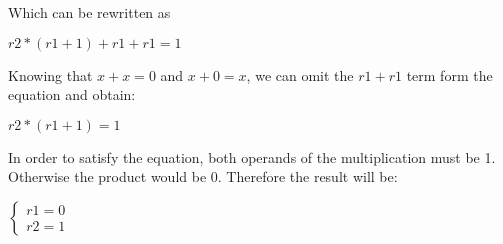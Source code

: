 Which can be rewritten as 

\begin{center}
\begin{math}
 r2 * (r1 + 1) + r1 + r1 = 1
\end{math} 
\end{center}

Knowing that $x + x = 0$ and $x + 0 = x$, we can omit the $r1+r1$ term form the equation and obtain:

\begin{center}
\begin{math}
 r2 * (r1 + 1) = 1
\end{math} 
\end{center}

In order to satisfy the equation, both operands of the multiplication must be 1. Otherwise the product would be 0. Therefore the result will be:

\begin{center}
\begin{math}
\begin{cases}
 r1 = 0\\
 r2 = 1
\end{cases}
\end{math} 
\end{center}

